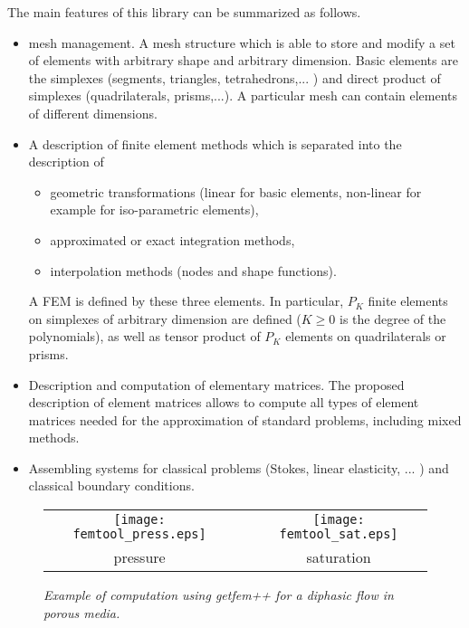 \documentclass[11pt,a4paper]{article}
\begin{document}
The main features of this library can be summarized as follows.
\begin{itemize}
\item  mesh management. A mesh structure which is able to store and modify a
set of elements with arbitrary shape and arbitrary dimension. Basic elements
are the simplexes (segments, triangles, tetrahedrons,... ) and direct
product of simplexes (quadrilaterals, prisms,...). A particular mesh can
contain elements of different dimensions.

\item  A description of finite element methods which is separated into the
description of
\begin{itemize}
\item  geometric transformations (linear for basic elements,  non-linear for
example for iso-parametric elements),

\item  approximated or exact integration methods,

\item  interpolation methods (nodes and shape functions).
\end{itemize}

A FEM is defined by these three elements. In particular, $P_{K}$
finite elements on simplexes of arbitrary dimension are defined ($K\geq 0$
is the degree of the polynomials), as well as tensor product of $P_{K}$
elements on quadrilaterals or prisms.

\item  Description and computation of elementary matrices. The proposed
description of element matrices allows to compute all types of element
matrices needed for the approximation of standard problems, including mixed
methods.

\item  Assembling systems for classical problems (Stokes, linear elasticity,
... ) and classical boundary conditions.
\end{itemize}

\begin{figure}[htbp]
\begin{center}
\begin{tabular}{ccc}
\texttt{[image: femtool\_press.eps]} & \hspace{1em} & %
\texttt{[image: femtool\_sat.eps]} \\ 
pressure &  & saturation
\end{tabular}
\end{center}
\caption{\textit{Example of computation using getfem++ for a diphasic flow
in porous media. }}
\label{fig:body}
\end{figure}
\end{document}
